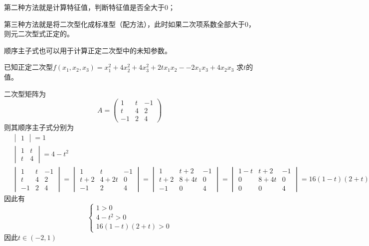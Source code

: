 第二种方法就是计算特征值，判断特征值是否全大于$0$；

第三种方法就是将二次型化成标准型（配方法），此时如果二次项系数全部大于$0$，则元二次型式正定的。

顺序主子式也可以用于计算正定二次型中的未知参数。
\begin{example}
    已知正定二次型$f(x_1,x_2,x_3)=x_1^2 + 4x_2^2 + 4x_3^2 + 2tx_1x_2 - -2x_1x_3 + 4x_2x_3$
    求$t$的值。
\end{example}
\begin{solution}
    二次型矩阵为
    \[
        A =
        \begin{pmatrix}
            1  & t & -1 \\
            t  & 4 & 2  \\
            -1 & 2 & 4
        \end{pmatrix}
    \]
    则其顺序主子式分别为
    \begin{align*}
         &
        \begin{vmatrix}
            1
        \end{vmatrix}  = 1    \\
         &
        \begin{vmatrix}
            1 & t \\
            t & 4
        \end{vmatrix} = 4-t^2 \\
         &
        \begin{vmatrix}
            1  & t & -1 \\
            t  & 4 & 2  \\
            -1 & 2 & 4
        \end{vmatrix} =
        \begin{vmatrix}
            1   & t    & -1 \\
            t+2 & 4+2t & 0  \\
            -1  & 2    & 4
        \end{vmatrix}
        =
        \begin{vmatrix}
            1   & t+2  & -1 \\
            t+2 & 8+4t & 0  \\
            -1  & 0    & 4
        \end{vmatrix}
        =
        \begin{vmatrix}
            1-t & t+2  & -1 \\
            0   & 8+4t & 0  \\
            0   & 0    & 4
        \end{vmatrix}
        = 16(1-t)(2+t)
    \end{align*}
    因此有
    \[
        \begin{cases}
            1>0     \\
            4-t^2>0 \\
            16(1-t)(2+t) > 0
        \end{cases}
    \]
    因此$t\in(-2,1)$
\end{solution}

